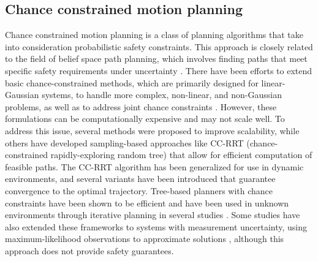 \documentclass[Afour,sageh,times]{sagej}
\begin{document}
\subsection{Chance constrained motion planning}
Chance constrained motion planning is a class of planning algorithms that take into consideration probabilistic safety constraints. This approach is closely related to the field of belief space path planning, which involves finding paths that meet specific safety requirements under uncertainty \cite{blackmore2006probabilistic_related_to_cc_1,blackmore2011chance_related_to_cc_2,vitus2011closed_related_to_cc_3}. There have been efforts to extend basic chance-constrained methods, which are primarily designed for linear-Gaussian systems, to handle more complex, non-linear, and non-Gaussian problems, as well as to address joint chance constraints \cite{blackmore2010probabilistic_cc_extend_1,wang2020non_cc_extend_2,ono2015chance_cc_extend_3}. However, these formulations can be computationally expensive and may not scale well. To address this issue, several methods were proposed to improve scalability, while others have developed sampling-based approaches like CC-RRT (chance-constrained rapidly-exploring random tree) that allow for efficient computation of feasible paths. The CC-RRT algorithm has been generalized for use in dynamic environments, and several variants have been introduced that guarantee convergence to the optimal trajectory. 
Tree-based planners with chance constraints have been shown to be efficient and have been used in unknown environments through iterative planning in several studies \cite{luders2010chance_unknown_1,pairet2021online_unknown_2,plaku2010motion_unknown_3}. Some studies have also extended these frameworks to systems with measurement uncertainty, using maximum-likelihood observations to approximate solutions \cite{platt2010belief_platt_2010}, although this approach does not provide safety guarantees. 
\end{document}
